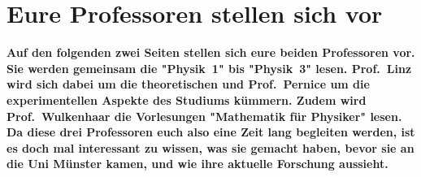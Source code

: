 \section{Eure Professoren stellen sich vor}
\vspace{-0.5cm}
\textbf{Auf den folgenden zwei Seiten stellen sich eure beiden Professoren vor. Sie werden gemeinsam die "Physik~1" bis "Physik~3" lesen. Prof.\ Linz wird sich dabei um die theoretischen und Prof.\ Pernice um die experimentellen Aspekte des Studiums kümmern. Zudem wird Prof.\ Wulkenhaar die Vorlesungen "Mathematik für Physiker" lesen. Da diese drei Professoren euch also eine Zeit lang begleiten werden, ist es doch mal interessant zu wissen, was sie gemacht haben, bevor sie an die Uni Münster kamen, und wie ihre aktuelle Forschung aussieht.}

